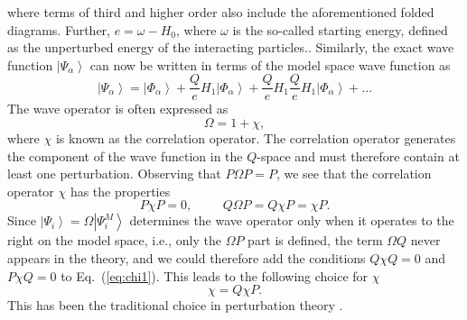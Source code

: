 \documentclass[twoside,12pt]{article}
\begin{document}
where terms of third and higher order also
include the aforementioned folded diagrams.
Further, $e=\omega -H_0$,
where $\omega$ is the so-called starting energy, defined as the unperturbed
energy of the interacting particles..
Similarly,
the exact wave
function $\left|\Psi_{\alpha}\right\rangle$
can now be written in terms of the model space wave function as
\begin{equation}
                \left|\Psi_{\alpha}\right\rangle=
                \left|\Phi_{\alpha}\right\rangle+
                \frac{Q}{e}H_1\left|\Phi_{\alpha}\right\rangle
                +\frac{Q}{e}H_1\frac{Q}{e}H_1\left|\Phi_{\alpha}\right\rangle
                +\dots
                \label{eq:wavef}
\end{equation}
The wave operator is often expressed as
\begin{equation}
              \Omega = 1 +\chi,
\end{equation}
where $\chi$ is known as the correlation operator. The correlation
operator generates the component of the wave function in the $Q$-space
and must therefore contain at least one perturbation. Observing
that $P\Omega P = P$, we see that the correlation operator $\chi$
has the properties
\begin{equation}
               P\chi P = 0, \hspace{1cm} Q\Omega P =
              Q\chi P =\chi P. \label{eq:chi1}
\end{equation}
Since  $\left|\Psi_i\right\rangle=\Omega\left|\Psi_i^{M}\right\rangle$
determines the wave operator
only when it operates to the right on the model space, i.e., only the
$\Omega P$  part is defined, the term $\Omega Q$
never appears in the theory,
and we could therefore add the conditions $Q\chi Q =0$ and $P\chi Q =0$
to Eq.\ (\ref{eq:chi1}). This leads to the following choice for $\chi$
\begin{equation}
                   \chi = Q\chi P. \label{eq:chi2}
\end{equation}
This has been the traditional choice in perturbation theory \cite{so95,lm85}.
\end{document}
